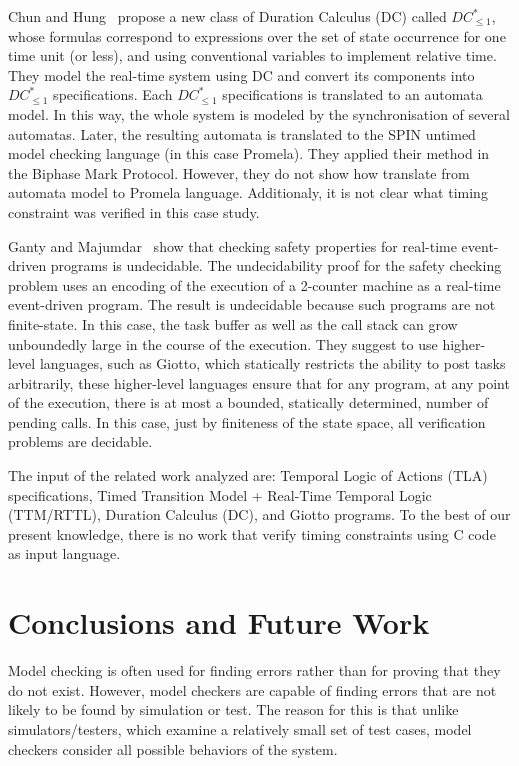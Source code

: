 \documentclass{llncs}
\begin{document}
Chun and Hung~\cite{Chun04} propose a new class of Duration Calculus (DC) called $DC^{*}_{\leq1}$, 
whose formulas correspond to expressions over the set of state occurrence for one time unit (or less),
and using conventional variables to implement relative time. 
They model the real-time system using DC and convert its components into $DC^{*}_{\leq1}$ specifications. 
Each $DC^{*}_{\leq1}$ specifications is translated to an automata model.
In this way, the whole system is modeled by the synchronisation of several automatas. 
Later, the resulting automata is translated to the SPIN untimed model checking language (in this case Promela). 
They applied their method in the Biphase Mark Protocol. 
However, they do not show how translate from automata model to Promela language. 
Additionaly, it is not clear what timing constraint was verified in this case study.

Ganty and Majumdar~\cite{Ganty09} show that checking safety properties for real-time event-driven programs
is undecidable. The undecidability proof for the safety checking problem uses an encoding 
of the execution of a 2-counter machine as a real-time event-driven program. 
The result is undecidable because such programs are not finite-state.
In this case, the task buffer as well as the call stack can grow unboundedly
large in the course of the execution.
They suggest to use higher-level languages, such as Giotto, 
which statically restricts the ability to
post tasks arbitrarily, these higher-level languages ensure that for any 
program, at any point of the execution, there is at most a bounded, statically determined, 
number of pending calls. In this case, just by finiteness of the
state space, all verification problems are decidable.


The input of the related work analyzed are: Temporal Logic of Actions (TLA) specifications, 
Timed Transition Model + Real-Time Temporal Logic (TTM/RTTL), 
Duration Calculus (DC), and Giotto programs. 
To the best of our present knowledge, there is no work that verify timing constraints using 
C code as input language.



\section{Conclusions and Future Work}



Model checking is often used for finding errors rather than for proving that they do not exist.
However, model checkers are capable of finding errors that are not likely to be found by simulation or test.
The reason for this is that unlike simulators/testers, which examine a relatively small set of
test cases, model checkers consider all possible behaviors of the system.
\end{document}
